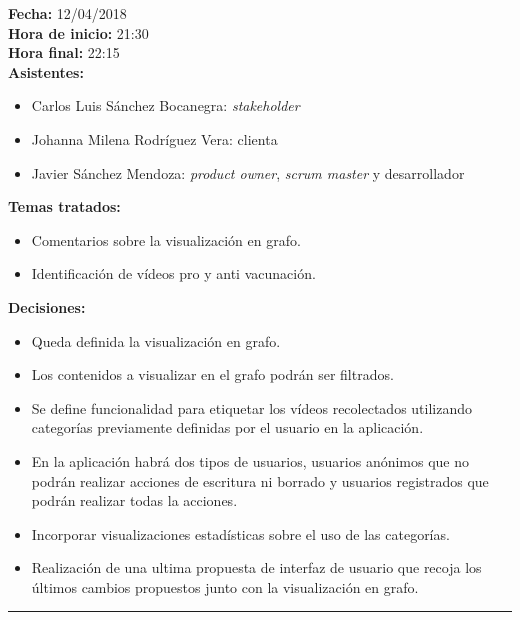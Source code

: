 \documentclass[11pt,a4paper]{article}
\begin{document}
\noindent\textbf{Fecha:} 12/04/2018
\\
\noindent\textbf{Hora de inicio:} 21:30
\\
\noindent\textbf{Hora final:} 22:15
\\
\noindent\textbf{Asistentes:} 
\begin{itemize}
\item Carlos Luis Sánchez Bocanegra: \textit{stakeholder}
\item Johanna Milena Rodríguez Vera: clienta
\item Javier Sánchez Mendoza: \textit{product owner}, \textit{scrum master} y desarrollador
\end{itemize}
\noindent\textbf{Temas tratados:}
\begin{itemize}
\item Comentarios sobre la visualización en grafo.
\item Identificación de vídeos pro y anti vacunación.
\end{itemize}
\noindent\textbf{Decisiones:}
\begin{itemize}
\item Queda definida la visualización en grafo.
\item Los contenidos a visualizar en el grafo podrán ser filtrados.
\item Se define funcionalidad para etiquetar los vídeos recolectados utilizando categorías previamente definidas por el usuario en la aplicación.
\item En la aplicación habrá dos tipos de usuarios, usuarios anónimos que no podrán realizar acciones de escritura ni borrado y usuarios registrados que podrán realizar todas la acciones.
\item Incorporar visualizaciones estadísticas sobre el uso de las categorías.
\item Realización de una ultima propuesta de interfaz de usuario que recoja los últimos cambios propuestos junto con la visualización en grafo.
\end{itemize}

\begin{center}\rule{10cm}{0.4pt}\end{center}
\end{document}
